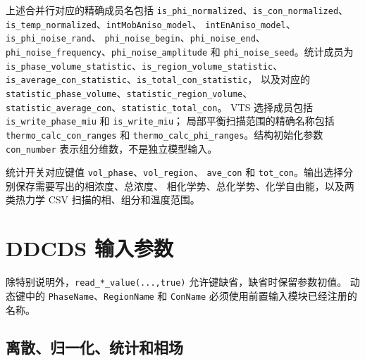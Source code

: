 \documentclass[UTF8,a4paper,11pt]{ctexart}
\newcommand{\code}[1]{\texttt{#1}}
\begin{document}
上述合并行对应的精确成员名包括
\code{is\_phi\_normalized}、\code{is\_con\_normalized}、
\code{is\_temp\_normalized}、\code{intMobAniso\_model}、
\code{intEnAniso\_model}、\code{is\_phi\_noise\_rand}、
\code{phi\_noise\_begin}、\code{phi\_noise\_end}、
\code{phi\_noise\_frequency}、\code{phi\_noise\_amplitude} 和
\code{phi\_noise\_seed}。统计成员为
\code{is\_phase\_volume\_statistic}、\code{is\_region\_volume\_statistic}、
\code{is\_average\_con\_statistic}、\code{is\_total\_con\_statistic}，
以及对应的 \code{statistic\_phase\_volume}、\code{statistic\_region\_volume}、
\code{statistic\_average\_con}、\code{statistic\_total\_con}。
VTS 选择成员包括 \code{is\_write\_phase\_miu} 和 \code{is\_write\_miu}；
局部平衡扫描范围的精确名称包括 \code{thermo\_calc\_con\_ranges} 和
\code{thermo\_calc\_phi\_ranges}。结构初始化参数 \code{con\_number}
表示组分维数，不是独立模型输入。

统计开关对应键值 \code{vol\_phase}、\code{vol\_region}、
\code{ave\_con} 和 \code{tot\_con}。输出选择分别保存需要写出的相浓度、总浓度、
相化学势、总化学势、化学自由能，以及两类热力学 CSV 扫描的相、组分和温度范围。

\section{DDCDS 输入参数}

除特别说明外，\code{read\_*\_value(...,true)} 允许键缺省，缺省时保留参数初值。
动态键中的 \code{PhaseName}、\code{RegionName} 和 \code{ConName}
必须使用前置输入模块已经注册的名称。

\subsection{离散、归一化、统计和相场}
\end{document}
